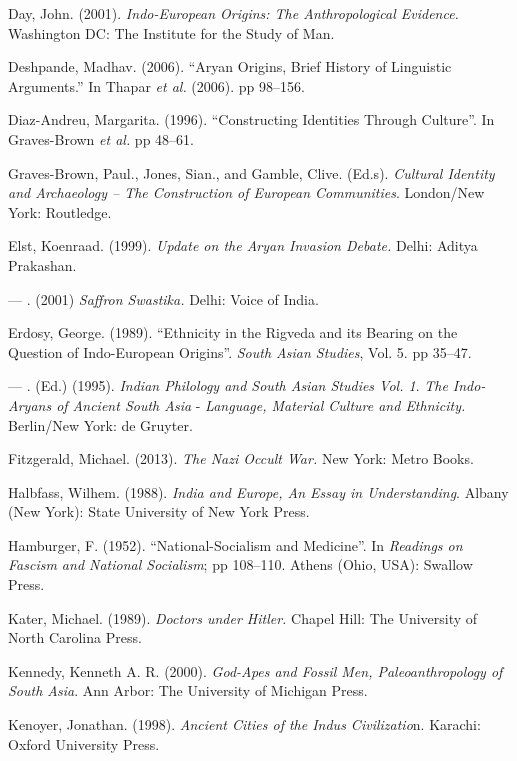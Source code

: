 \begin{thebibliography}{99}
  Day, John. (2001). \textit{Indo-European Origins: The Anthropological Evidence.} Washington DC: The Institute for the Study of Man.

  Deshpande, Madhav. (2006). “Aryan Origins, Brief History of Linguistic Arguments.” In Thapar \textit{et al.} (2006). pp 98--156.

  Diaz-Andreu, Margarita. (1996). “Constructing Identities Through Culture”. In Graves-Brown \textit{et al.} pp 48--61.

  Graves-Brown, Paul., Jones, Sian., and Gamble, Clive. (Ed.s). \textit{Cultural Identity and Archaeology – The Construction of European Communities}. London/New York: Routledge.

  Elst, Koenraad. (1999). \textit{Update on the Aryan Invasion Debate. }Delhi: Aditya Prakashan.

  — . (2001) \textit{Saffron Swastika. }Delhi: Voice of India.

  Erdosy, George. (1989). “Ethnicity in the Rigveda and its Bearing on the Question of Indo-European Origins”. \textit{South Asian Studies}, Vol. 5. pp 35--47.

  — . (Ed.) (1995). \textit{Indian Philology and South Asian Studies Vol. 1}. \textit{The Indo-Aryans of Ancient South Asia} - \textit{Language, Material Culture and Ethnicity. } Berlin/New York: de Gruyter.

  Fitzgerald, Michael. (2013). \textit{The Nazi Occult War. }New York: Metro Books.

  Halbfass, Wilhem. (1988). \textit{India and Europe, An Essay in Understanding}. Albany (New York): State University of New York Press.

  Hamburger, F. (1952). “National-Socialism and Medicine”. In \textit{Readings on Fascism and National Socialism}; pp 108--110. Athens (Ohio, USA): Swallow Press.

  Kater, Michael. (1989). \textit{Doctors under Hitler.} Chapel Hill: The University of North Carolina Press.

  Kennedy, Kenneth A. R. (2000). \textit{God-Apes and Fossil Men, Paleoanthropology of South Asia}. Ann Arbor: The University of Michigan Press.

  Kenoyer, Jonathan. (1998). \textit{Ancient Cities of the Indus Civilizatio}n. Karachi: Oxford University Press.


\end{thebibliography}
